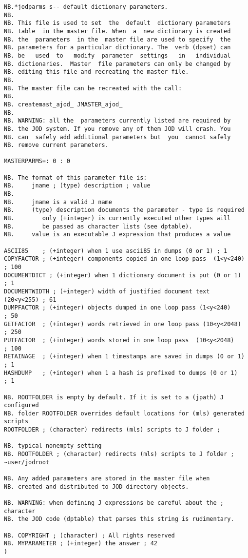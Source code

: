 \begin{lstlisting}[frame=single,framerule=0pt,basicstyle=\ttfamily\footnotesize]
NB.*jodparms s-- default dictionary parameters.
NB.
NB. This file is used to set  the  default  dictionary parameters
NB. table  in the master file. When  a  new dictionary is created
NB. the  parameters  in the  master file are used to specify  the
NB. parameters for a particular dictionary. The  verb (dpset) can
NB. be   used  to   modify  parameter  settings   in   individual
NB. dictionaries.  Master  file parameters can only be changed by
NB. editing this file and recreating the master file.
NB.
NB. The master file can be recreated with the call:
NB.
NB. createmast_ajod_ JMASTER_ajod_
NB.
NB. WARNING: all the  parameters currently listed are required by
NB. the JOD system. If you remove any of them JOD will crash. You
NB. can  safely add additional parameters but  you  cannot safely
NB. remove current parameters.

MASTERPARMS=: 0 : 0

NB. The format of this parameter file is:
NB.     jname ; (type) description ; value
NB. 
NB.     jname is a valid J name
NB.     (type) description documents the parameter - type is required
NB.        only (+integer) is currently executed other types will
NB.        be passed as character lists (see dptable).
NB.     value is an executable J expression that produces a value

ASCII85    ; (+integer) when 1 use ascii85 in dumps (0 or 1) ; 1  
COPYFACTOR ; (+integer) components copied in one loop pass  (1<y<240) ; 100
DOCUMENTDICT ; (+integer) when 1 dictionary document is put (0 or 1)  ; 1
DOCUMENTWIDTH ; (+integer) width of justified document text  (20<y<255) ; 61
DUMPFACTOR ; (+integer) objects dumped in one loop pass (1<y<240)     ; 50
GETFACTOR  ; (+integer) words retrieved in one loop pass (10<y<2048)  ; 250
PUTFACTOR  ; (+integer) words stored in one loop pass  (10<y<2048)    ; 100
RETAINAGE  ; (+integer) when 1 timestamps are saved in dumps (0 or 1) ; 1
HASHDUMP   ; (+integer) when 1 a hash is prefixed to dumps (0 or 1)   ; 1

NB. ROOTFOLDER is empty by default. If it is set to a (jpath) J configured 
NB. folder ROOTFOLDER overrides default locations for (mls) generated scripts 
ROOTFOLDER ; (character) redirects (mls) scripts to J folder ; 

NB. typical nonempty setting
NB. ROOTFOLDER ; (character) redirects (mls) scripts to J folder ; ~user/jodroot 

NB. Any added parameters are stored in the master file when
NB. created and distributed to JOD directory objects.  

NB. WARNING: when defining J expressions be careful about the ; character 
NB. the JOD code (dptable) that parses this string is rudimentary.

NB. COPYRIGHT ; (character) ; All rights reserved
NB. MYPARAMETER ; (+integer) the answer ; 42
)
\end{lstlisting}


